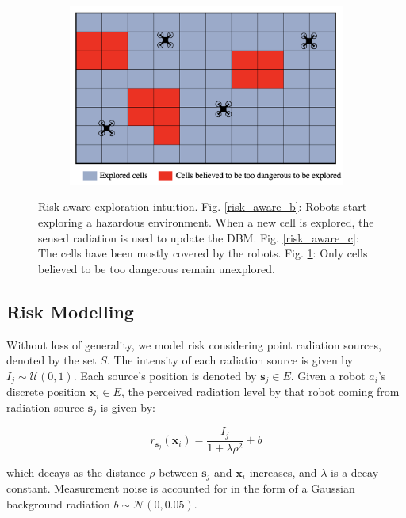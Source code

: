 \documentclass[letterpaper, 10 pt, conference]{ieeeconf}
\begin{document}
\begin{figure}[h]
\begin{subfigure}{0.30\textwidth}
         \centering
         \includegraphics[width=\textwidth]{images/risk_aware_d.png}
         \caption{}
         \label{risk_aware_d}
    \end{subfigure}
        \caption{Risk aware exploration intuition. Fig. \ref{risk_aware_b}: Robots start exploring a hazardous environment. When a new cell is explored, the sensed radiation is used to update the DBM. Fig. \ref{risk_aware_c}: The cells have been mostly covered by the robots. Fig. \ref{risk_aware_d}: Only cells believed to be too dangerous remain unexplored.}
    \label{risk_aware}
\end{figure}


\subsection{Risk Modelling}
Without loss of generality, we model risk considering point radiation
sources, denoted by the set $S$. The intensity of each radiation
source is given by $I_j\sim\mathcal{U}(0, 1)$. Each source's position
is denoted by $\bm{s}_j \in E$. Given a robot $a_i$'s discrete
position $\bm{x}_i \in E$, the perceived radiation level by that robot coming from radiation source $\bm{s}_j$ is given by:

\begin{equation}
    r_{\bm{s}_j}(\bm{x}_i) = \frac{I_j}{1 + \lambda\rho^2} + b
    \label{eq:radiation}
\end{equation}

which decays as the distance $\rho$ between $\bm{s}_j$ and $\bm{x}_i$
increases, and $\lambda$ is a decay constant. Measurement noise is
accounted for in the form of a Gaussian background radiation
$b \sim \mathcal{N}(0, 0.05)$. 
\end{document}
